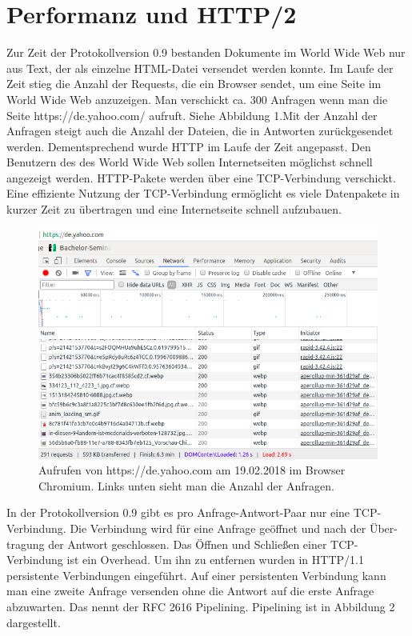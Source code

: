 \documentclass{llncs}
\begin{document}
\section{Performanz und HTTP/2}
Zur Zeit der Protokollversion 0.9 bestanden Dokumente im World Wide Web nur aus Text, der als einzelne HTML-Datei versendet werden konnte. Im Laufe der Zeit stieg die Anzahl der Requests, die ein Browser sendet, um eine Seite im World Wide Web anzuzeigen. Man verschickt ca. 300 Anfragen wenn man die Seite https://de.yahoo.com/ aufruft. Siehe Abbildung 1.\newline Mit der Anzahl der Anfragen steigt auch die Anzahl der Dateien, die in Antworten zurückgesendet werden. Dementsprechend wurde HTTP im Laufe der Zeit angepasst. Den Benutzern des des World Wide Web sollen Internetseiten möglichst schnell angezeigt werden.
HTTP-Pakete werden über eine TCP-Verbindung verschickt. Eine effiziente Nutzung der TCP-Verbindung ermöglicht es viele Datenpakete in kurzer Zeit zu übertragen und eine Internetseite schnell aufzubauen.
\begin{figure}[!ht]
\includegraphics[width=\columnwidth]{yahooRequests}
\caption{Aufrufen von https://de.yahoo.com am 19.02.2018 im Browser Chromium. Links unten sieht man die Anzahl der Anfragen.}


\end{figure}


In der Protokollversion 0.9 gibt es pro Anfrage-Antwort-Paar nur eine TCP-Verbindung. Die Verbindung wird für eine Anfrage geöffnet und nach der Über-tragung der Antwort geschlossen. Das Öffnen und Schließen einer TCP-Verbindung ist ein Overhead. Um ihn zu entfernen wurden in HTTP/1.1 persistente Verbindungen eingeführt. Auf einer persistenten Verbindung kann man eine zweite Anfrage versenden ohne die Antwort auf die erste Anfrage abzuwarten. Das nennt der RFC 2616 Pipelining. Pipelining ist in Abbildung 2 dargestellt.
\end{document}
